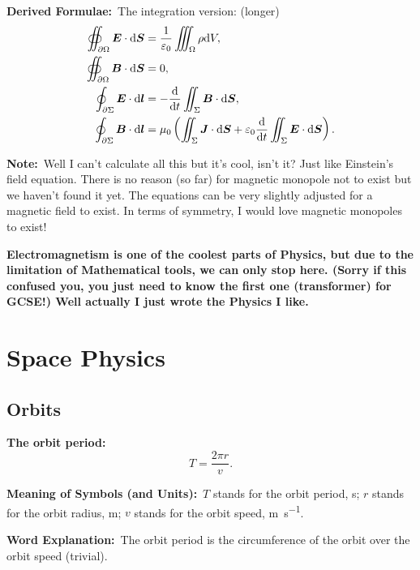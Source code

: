 \documentclass[8pt]{article}
\newcommand{\MeanSymb}{\textbf{Meaning of Symbols (and Units):}\ }
\newcommand{\WordExpl}{\textbf{Word Explanation:}\ }
\newcommand{\DeriForm}{\textbf{Derived Formulae:}\ }
\newcommand{\Note}{\textbf{Note:}\ }
\begin{document}
\begin{enumerate}
                \DeriForm The integration version: (longer)
                \begin{align*}
                    \oiint_{\partial \Omega} \boldsymbol{E} \cdot \mathrm{d} \boldsymbol{S} &= \frac{1}{\varepsilon_0} \iiint_{\Omega} \rho \mathrm{d} V,\\
                    \oiint_{\partial \Omega} \boldsymbol{B} \cdot \mathrm{d} \boldsymbol{S} &= 0,\\
                    \oint_{\partial \Sigma} \boldsymbol{E} \cdot \mathrm{d} \boldsymbol{l} &= - \frac{\mathrm{d}}{\mathrm{d} t} \iint_{\Sigma} \boldsymbol{B} \cdot \mathrm{d} \boldsymbol{S},\\
                    \oint_{\partial \Sigma} \boldsymbol{B} \cdot \mathrm{d} \boldsymbol{l} &= \mu_0 \left(\iint_{\Sigma} \boldsymbol{J} \cdot \mathrm{d} \boldsymbol{S} + \varepsilon_0 \frac{\mathrm{d}}{\mathrm{d} t} \iint_{\Sigma} \boldsymbol{E} \cdot \mathrm{d} \boldsymbol{S}\right).
                \end{align*}

                \Note Well I can't calculate all this but it's cool, isn't it? Just like Einstein's field equation. There is no reason (so far) for magnetic monopole not to exist but we haven't found it yet. The equations can be very slightly adjusted for a magnetic field to exist. In terms of symmetry, I would love magnetic monopoles to exist!
            \end{enumerate}

            \textbf{Electromagnetism is one of the coolest parts of Physics, but due to the limitation of Mathematical tools, we can only stop here. (Sorry if this confused you, you just need to know the first one (transformer) for GCSE!) Well actually I just wrote the Physics I like.}

    \section{Space Physics}
        \subsection{Orbits}
            \textbf{The orbit period:}
            \[
                T = \frac{2 \pi r}{v}.
            \]

            \MeanSymb \(T\) stands for the orbit period, \unit{\second}; \(r\) stands for the orbit radius, \unit{\metre}; \(v\) stands for the orbit speed, \unit{\metre\per\second}.

            \WordExpl The orbit period is the circumference of the orbit over the orbit speed (trivial).
\end{document}
